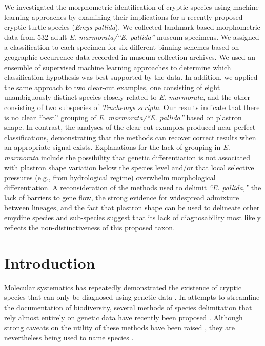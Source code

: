 \documentclass[11pt]{article}
\begin{document}
  We investigated the morphometric identification of cryptic species using machine learning approaches by examining their implications for a recently proposed cryptic turtle species (\textit{Emys pallida}). We collected landmark-based morphometric data from 532 adult \textit{E. marmorata/``E. pallida''} museum specimens. We assigned a classification to each specimen for six different binning schemes based on geographic occurrence data recorded in museum collection archives. We used an ensemble of supervised machine learning approaches to determine which classification hypothesis was best supported by the data. In addition, we applied the same approach to two clear-cut examples, one consisting of eight unambiguously distinct species closely related to \textit{E. marmorata}, and the other consisting of two subspecies of \textit{Trachemys scripta}. Our results indicate that there is no clear ``best'' grouping of \textit{E. marmorata/``E. pallida''} based on plastron shape. In contrast, the analyses of the clear-cut examples produced near perfect classifications, demonstrating that the methods can recover correct results when an appropriate signal exists. Explanations for the lack of grouping in \textit{E. marmorata} include the possibility that genetic differentiation is not associated with plastron shape variation below the species level and/or that local selective pressures (e.g., from hydrological regime) overwhelm morphological differentiation. A reconsideration of the methods used to delimit \textit{``E. pallida,''} the lack of barriers to gene flow, the strong evidence for widespread admixture between lineages, and the fact that plastron shape can be used to delineate other emydine species and sub-species suggest that its lack of diagnosability most likely reflects the non-distinctiveness of this proposed taxon. 

\newpage{}

\section*{Introduction}

Molecular systematics has repeatedly demonstrated the existence of cryptic species that can only be diagnosed using genetic data \citep{Stuart2006,Bickford2007,SchlickSteiner2007,Pfenninger2007,Clare2011,Funk2012}. In attempts to streamline the documentation of biodiversity, several methods of species delimitation that rely almost entirely on genetic data have recently been proposed \citep{Pons2006,Carstens2010,Hausdorf2010,O'Meara2010,Yang2010b,Huelsenbeck2011b}. Although strong caveats on the utility of these methods have been raised \citep{Bauer2000,Carstens2013}, they are nevertheless being used to name species \citep{Leache2010,Spinks2014}.
\end{document}
